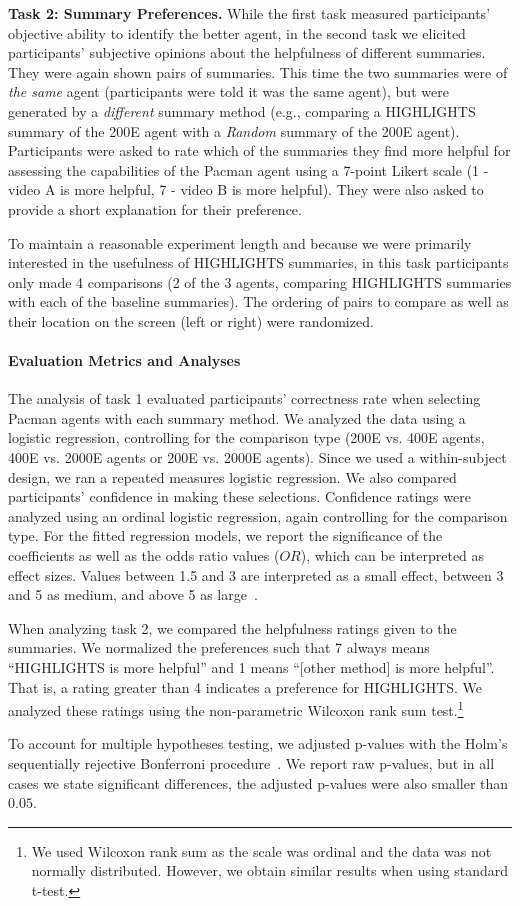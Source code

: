 \textbf{Task 2: Summary Preferences.}
While the first task measured participants' objective ability to identify the better agent, in the second task we elicited participants' subjective opinions about the helpfulness of different summaries. They were again shown pairs of summaries. This time the two summaries were of \emph{the same} agent (participants were told it was the same agent), but were generated by a \emph{different} summary method (e.g., comparing a HIGHLIGHTS summary of the 200E agent with a \emph{Random} summary of the 200E agent). Participants were asked to rate which of the summaries they find more helpful for assessing the capabilities of the Pacman agent using a 7-point Likert scale (1 - video A is more helpful, 7 - video B is more helpful). They were also asked to provide a short explanation for their preference. 

To maintain a reasonable experiment length and because we were primarily interested in the usefulness of HIGHLIGHTS summaries, in this task participants only made 4 comparisons (2 of the 3 agents, comparing HIGHLIGHTS summaries with each of the baseline summaries). The ordering of pairs to compare as well as their location on the screen (left or right) were randomized. 

\paragraph{Evaluation Metrics and Analyses}
The analysis of task 1 evaluated participants' correctness rate when selecting Pacman agents with each summary method. We analyzed the data using a logistic regression, controlling for the comparison type (200E vs. 400E agents, 400E vs. 2000E agents or 200E vs. 2000E agents). Since we used a within-subject design, we ran a repeated measures logistic regression. We also compared participants' confidence in making these selections. Confidence ratings were analyzed using an ordinal logistic regression, again controlling for the comparison type.  For the fitted regression models, we report the significance of the coefficients as well as the odds ratio values ($OR$), which can be interpreted as effect sizes. Values between 1.5 and 3 are interpreted as a small effect, between 3 and 5 as medium, and above 5 as large~\cite{borenstein2009converting,chen2010big}.

When analyzing task 2, we compared the helpfulness ratings given to the summaries. We normalized the preferences such that 7 always means ``HIGHLIGHTS is more helpful'' and 1 means ``[other method] is more helpful''. That is, a rating greater than 4 indicates a preference for HIGHLIGHTS. We analyzed these ratings using the non-parametric Wilcoxon rank sum test.\footnote{We used Wilcoxon rank sum as the scale was ordinal and the data was not normally distributed. However, we obtain similar results when using standard t-test.}

To account for multiple hypotheses testing, we adjusted p-values with the Holm's sequentially rejective Bonferroni procedure~\cite{holm79:simple,shaffer95:multiple}. We report raw p-values, but in all cases we state significant differences, the adjusted p-values were also smaller than $0.05$.




